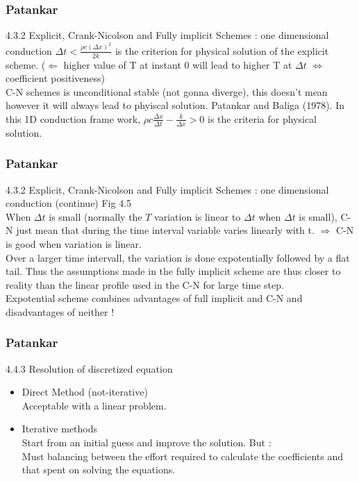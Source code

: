 \documentclass{beamer}
\begin{document}
\begin{frame}
\frametitle{Patankar}
\begin{block}{4.3.2 Explicit, Crank-Nicolson and Fully implicit Schemes : one dimensional conduction}
	$\Delta t < \frac{\rho c (\Delta x)^2}{2k} $ is the criterion for physical solution of the explicit scheme. 
	($\Leftarrow$ higher value of T at instant 0 will lead to higher T at $\Delta t$ $\iff$ coefficient positiveness) \\
	C-N schemes is unconditional stable (not gonna diverge), this doesn't mean however it will always lead to phyiscal solution. Patankar and Baliga (1978). 
	In this 1D conduction frame work, $ \rho c \frac{\Delta x}{\Delta t} - \frac{k}{\Delta x} > 0$ is the criteria for physical solution.\\

\end{block}
\end{frame}


\begin{frame}
\frametitle{Patankar}
\begin{block}{4.3.2 Explicit, Crank-Nicolson and Fully implicit Schemes : one dimensional conduction (continue)}
	Fig 4.5 \\
	When $\Delta t$ is small (normally the $T$ variation is linear to $\Delta t$ when $\Delta t$ is small), C-N just mean that during the time interval variable varies linearly with t. $\Rightarrow$ C-N is good when variation is linear.\\
	Over a larger time intervall, the variation is done expotentially followed by a flat tail. Thus the assumptions made in the fully implicit scheme are thus closer to reality than the linear profile used in the C-N for large time step. \\
	Expotential scheme combines advantages of full implicit and C-N and disadvantages of neither !
\end{block}
\end{frame}


\begin{frame}
\frametitle{Patankar}
\begin{block}{4.4.3 Resolution of discretized equation}
\begin{itemize}
	\item Direct Method (not-iterative) \\
	Acceptable with a linear problem.
	\item Iterative methods \\
	Start from an initial guess and improve the solution. But : \\
	Must balancing between the effort required to calculate the coefficients and that spent on solving the equations.
\end{itemize}
\end{block}

\end{frame}
\end{document}
